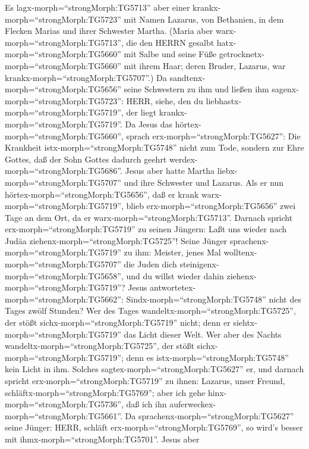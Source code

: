  Es lagx-morph=``strongMorph:TG5713'' aber einer
krankx-morph=``strongMorph:TG5723'' mit Namen Lazarus, von Bethanien, in
dem Flecken Marias und ihrer Schwester Martha.  (Maria aber
warx-morph=``strongMorph:TG5713'', die den HERRN gesalbt
hatx-morph=``strongMorph:TG5660'' mit Salbe und seine Füße
getrocknetx-morph=``strongMorph:TG5660'' mit ihrem Haar; deren Bruder,
Lazarus, war krankx-morph=``strongMorph:TG5707''.)  Da
sandtenx-morph=``strongMorph:TG5656'' seine Schwestern zu ihm und ließen
ihm sagenx-morph=``strongMorph:TG5723'': HERR, siehe, den du
liebhastx-morph=``strongMorph:TG5719'', der liegt
krankx-morph=``strongMorph:TG5719''.  Da Jesus das
hörtex-morph=``strongMorph:TG5660'', sprach
erx-morph=``strongMorph:TG5627'': Die Krankheit
istx-morph=``strongMorph:TG5748'' nicht zum Tode, sondern zur Ehre
Gottes, daß der Sohn Gottes dadurch geehrt
werdex-morph=``strongMorph:TG5686''.  Jesus aber hatte
Martha liebx-morph=``strongMorph:TG5707'' und ihre Schwester und
Lazarus.  Als er nun hörtex-morph=``strongMorph:TG5656'',
daß er krank warx-morph=``strongMorph:TG5719'', blieb
erx-morph=``strongMorph:TG5656'' zwei Tage an dem Ort, da er
warx-morph=``strongMorph:TG5713''.  Darnach spricht
erx-morph=``strongMorph:TG5719'' zu seinen Jüngern: Laßt uns wieder nach
Judäa ziehenx-morph=``strongMorph:TG5725''!  Seine Jünger
sprachenx-morph=``strongMorph:TG5719'' zu ihm: Meister, jenes Mal
wolltenx-morph=``strongMorph:TG5707'' die Juden dich
steinigenx-morph=``strongMorph:TG5658'', und du willst wieder dahin
ziehenx-morph=``strongMorph:TG5719''?  Jesus
antwortetex-morph=``strongMorph:TG5662'':
Sindx-morph=``strongMorph:TG5748'' nicht des Tages zwölf Stunden? Wer
des Tages wandeltx-morph=``strongMorph:TG5725'', der stößt
sichx-morph=``strongMorph:TG5719'' nicht; denn er
siehtx-morph=``strongMorph:TG5719'' das Licht dieser Welt. 
Wer aber des Nachts wandeltx-morph=``strongMorph:TG5725'', der stößt
sichx-morph=``strongMorph:TG5719''; denn es
istx-morph=``strongMorph:TG5748'' kein Licht in ihm. 
Solches sagtex-morph=``strongMorph:TG5627'' er, und darnach spricht
erx-morph=``strongMorph:TG5719'' zu ihnen: Lazarus, unser Freund,
schläftx-morph=``strongMorph:TG5769''; aber ich gehe
hinx-morph=``strongMorph:TG5736'', daß ich ihn
auferweckex-morph=``strongMorph:TG5661''.  Da
sprachenx-morph=``strongMorph:TG5627'' seine Jünger: HERR, schläft
erx-morph=``strongMorph:TG5769'', so wird's besser mit
ihmx-morph=``strongMorph:TG5701''.  Jesus aber
